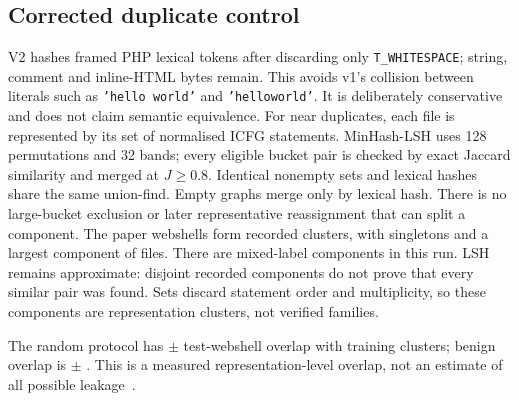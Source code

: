 \subsection{Corrected duplicate control}\label{sec:leak}
V2 hashes framed PHP lexical tokens after discarding only \texttt{T\_WHITESPACE}; string, comment and inline-HTML
bytes remain. This avoids v1's collision between literals such as \texttt{'hello world'} and \texttt{'helloworld'}.
It is deliberately conservative and does not claim semantic equivalence.
For near duplicates, each file is represented by its set of normalised ICFG statements. MinHash-LSH uses
128 permutations and 32 bands; every eligible bucket pair is checked by exact Jaccard similarity and merged at
$J\geq0.8$. Identical nonempty sets and lexical hashes share the same union-find. Empty graphs merge only by
lexical hash. There is no large-bucket exclusion or later representative reassignment that can split a component.
The  paper webshells form  recorded clusters, with
 singletons and a largest component of  files.
There are  mixed-label components in this run.
LSH remains approximate: disjoint recorded components do not prove that every similar pair was found.
Sets discard statement order and multiplicity, so these components are representation clusters, not verified families.

The random protocol has  $\pm$  test-webshell overlap
with training clusters; benign overlap is  $\pm$ .
This is a measured representation-level overlap, not an estimate of all possible leakage~\cite{allamanis2019duplication,arp2022dos}.

